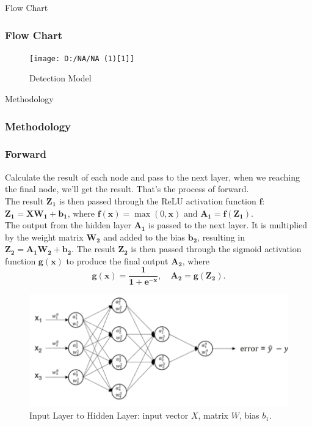 \documentclass[aspectratio=1610]{beamer}
\begin{document}
\begin{frame}{Flow Chart}
    \frametitle{Flow Chart}
        \begin{figure}
        \centering
        \texttt{[image: D:/NA/NA (1)[1]]}
        \caption{Detection Model}
        \label{fig:enter-label}
    \end{figure}
      
    
\end{frame}

\begin{frame}{Methodology}
    \frametitle{Methodology}


\end{frame}

\begin{frame}
    \frametitle{Forward}
    Calculate the result of each node and pass to the next layer, when we reaching the final node, we’ll get the result. That’s the process of forward.
    \\The result $\boldsymbol{Z_1}$ is then passed through the ReLU activation function $\boldsymbol{f}$: 
    $\boldsymbol{Z_1} = \boldsymbol{X} \boldsymbol{W_1} + \boldsymbol{b_1}$, where 
    $\boldsymbol{f(x)} = \max(0, \boldsymbol{x})$ and $\boldsymbol{A_1} = \boldsymbol{f(Z_1)}$.
    \\The output from the hidden layer $\boldsymbol{A_1}$ is passed to the next layer. It is multiplied by the weight matrix $\boldsymbol{W_2}$ and added to the bias $\boldsymbol{b_2}$, resulting in $\boldsymbol{Z_2} = \boldsymbol{A_1}\boldsymbol{W_2} + \boldsymbol{b_2}$. The result $\boldsymbol{Z_2}$ is then passed through the sigmoid activation function $\boldsymbol{g(x)}$ to produce the final output $\boldsymbol{A_2}$, where 
    \[
    \boldsymbol{g(x)} = \frac{\boldsymbol{1}}{\boldsymbol{1} + \boldsymbol{e}^{-\boldsymbol{x}}}, \quad \boldsymbol{A_2} = \boldsymbol{g(Z_2)}.
    \]

    
    \begin{figure}
        \centering
        \begin{minipage}{0.6\textwidth}
            \centering
            \includegraphics[width=\linewidth]{Forward.png}
        \end{minipage}%
        \hfill
        \begin{minipage}{0.35\textwidth}
            \centering
            \caption{Input Layer to Hidden Layer: input vector $X$, matrix $W$, bias $b_1$.}
            \label{fig:enter-label}
        \end{minipage}
    \end{figure}
\end{frame}
\end{document}

